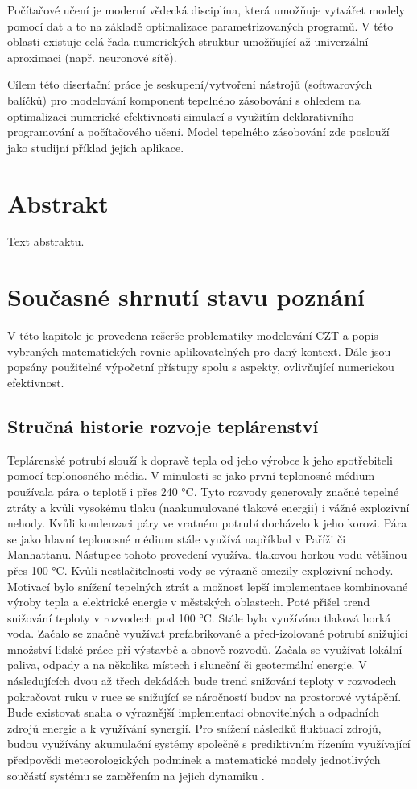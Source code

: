 Počítačové učení je moderní vědecká disciplína, která umožňuje vytvářet modely 
pomocí dat a to na základě optimalizace parametrizovaných programů. V této 
oblasti existuje celá řada numerických struktur umožňující až univerzální 
aproximaci (např. neuronové sítě).

Cílem této disertační práce je seskupení/vytvoření nástrojů (softwarových 
balíčků) pro modelování komponent tepelného zásobování s ohledem na 
optimalizaci numerické efektivnosti simulací s využitím deklarativního 
programování a počítačového učení. Model tepelného zásobování zde poslouží jako 
studijní příklad jejich aplikace.

\chapter{Abstrakt}
\label{abstrakt}
Text abstraktu.

\chapter{Současné shrnutí stavu poznání} 
\label{struktura}
V této kapitole je provedena rešerše problematiky modelování CZT a popis 
vybraných matematických rovnic aplikovatelných pro daný kontext. Dále jsou 
popsány použitelné výpočetní přístupy spolu s aspekty, ovlivňující numerickou 
efektivnost. 

\section{Stručná historie rozvoje teplárenství}
Teplárenské potrubí slouží k dopravě tepla od jeho výrobce k jeho spotřebiteli 
pomocí teplonosného média. V minulosti se jako první teplonosné médium 
používala pára o teplotě i přes 240 °C. Tyto rozvody generovaly značné tepelné 
ztráty a kvůli vysokému tlaku (naakumulované tlakové energii) i vážné 
explozivní nehody. Kvůli kondenzaci páry ve vratném potrubí docházelo k jeho 
korozi. Pára se jako hlavní teplonosné médium stále využívá například v Paříži 
či Manhattanu. Nástupce tohoto provedení využíval tlakovou horkou vodu většinou 
přes 100 °C. Kvůli nestlačitelnosti vody se výrazně omezily explozivní nehody. 
Motivací bylo snížení tepelných ztrát a možnost lepší implementace kombinované 
výroby tepla a elektrické energie v městských oblastech. Poté přišel trend 
snižování teploty v rozvodech pod 100 °C. Stále byla využívána tlaková horká 
voda. Začalo se značně využívat prefabrikované a před-izolované potrubí 
snižující množství lidské práce při výstavbě a obnově rozvodů. Začala se 
využívat lokální paliva, odpady a na několika místech i sluneční či geotermální 
energie. V následujících dvou až třech dekádách bude trend snižování teploty v 
rozvodech pokračovat ruku v ruce se snižující se náročností budov na prostorové 
vytápění. Bude existovat snaha o výraznější implementaci obnovitelných a 
odpadních zdrojů energie a k využívání synergií. Pro snížení následků fluktuací 
zdrojů, budou využívány akumulační systémy společně s prediktivním řízením 
využívající předpovědi meteorologických podmínek a matematické modely 
jednotlivých součástí systému se zaměřením na jejich dynamiku \cite{Lund2014}.

